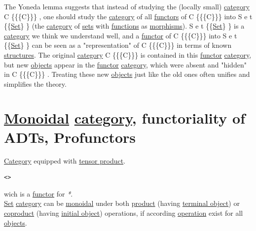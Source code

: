 \documentclass[a4paper,14pt,oneside]{book}
\begin{document}
The Yoneda lemma suggests that instead of studying the (locally small) \hyperref[org841d8bc]{category} C \{\displaystyle \{\mathcal \{C\}\}\}  , one should study the \hyperref[org841d8bc]{category} of all \hyperref[orgcde2498]{functors} of C \{\displaystyle \{\mathcal \{C\}\}\}  into S e t \{\displaystyle \mathbf \{\hyperref[orge119629]{Set}\} \}  (the \hyperref[org841d8bc]{category} of \hyperref[org1faae0f]{sets} with \hyperref[org0bd6046]{functions} as \hyperref[org9d6b2ec]{morphisms}). S e t \{\displaystyle \mathbf \{\hyperref[orge119629]{Set}\} \}  is a \hyperref[org841d8bc]{category} we think we understand well, and a \hyperref[orge5e236e]{functor} of C \{\displaystyle \{\mathcal \{C\}\}\}  into S e t \{\displaystyle \mathbf \{\hyperref[orge119629]{Set}\} \}  can be seen as a "representation" of C \{\displaystyle \{\mathcal \{C\}\}\}  in terms of known \hyperref[org5ea44de]{structures}. The original \hyperref[org841d8bc]{category} C \{\displaystyle \{\mathcal \{C\}\}\}  is contained in this \hyperref[orge5e236e]{functor} \hyperref[org841d8bc]{category}, but new \hyperref[org22f7883]{objects} appear in the \hyperref[orge5e236e]{functor} \hyperref[org841d8bc]{category}, which were absent and "hidden" in C \{\displaystyle \{\mathcal \{C\}\}\}  . Treating these new \hyperref[org22f7883]{objects} just like the old ones often unifies and simplifies the theory.\\

\chapter{\hyperref[org94afd7a]{Monoidal} \hyperref[org841d8bc]{category}, functoriality of ADTs, Profunctors}
\label{sec:orge2aef73}

\hyperref[org841d8bc]{Category} equipped with \hyperref[org75ab297]{tensor product}.\\
\begin{verbatim}
<>
\end{verbatim}
wich is a \hyperref[orge5e236e]{functor} for \emph{*}.\\

\hyperref[orge119629]{Set} \hyperref[org841d8bc]{category} can be \hyperref[org94afd7a]{monoidal} under both \hyperref[org7331b6a]{product} (having \hyperref[org7531dc2]{terminal object}) or \hyperref[orge94759d]{coproduct} (having \hyperref[org44a2914]{initial object}) operations, if according \hyperref[org6ed0c27]{operation} exist for all \hyperref[org22f7883]{objects}.\\
\end{document}
